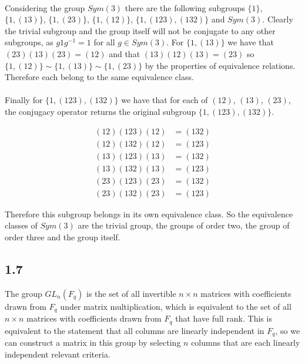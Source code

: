 \documentclass{article}
\begin{document}
\paragraph{}
Considering the group $Sym(3)$ there are the following subgroups $\{1\}$, $\{1,(13)\}$, $\{1,(23)\}$, $\{1, (12)\}$,
$\{1, (123), (132)\}$ and $Sym(3)$. Clearly the trivial subgroup and the group itself will not be conjugate to any other subgroups, as 
$g1g^{-1} = 1$ for all $g \in Sym(3)$. For $\{1,(13)\}$ we have that $(23)(13)(23) = (12)$ and that 
$(13)(12)(13) = (23)$ so $\{1, (12)\} \sim \{1,(13)\} \sim \{1, (23)\}$ by the properties of 
equivalence relations. Therefore each belong to the same equivalence class.

\paragraph{}
Finally for 
$\{1, (123), (132)\}$ we have that for each of $(12)$, $(13)$, $(23)$, the conjugacy operator 
returns the original subgroup $\{1, (123), (132)\}$. 

\begin{align*}
	(12)(123)(12) &= (132) \\
	(12)(132)(12) &= (123) \\
	(13)(123)(13) &= (132) \\
	(13)(132)(13) &= (123) \\
	(23)(123)(23) &= (132) \\
	(23)(132)(23) &= (123)
\end{align*}


Therefore this subgroup belongs in its own 
equivalence class. So the equivalence classes of $Sym(3)$ are the trivial group, the groups of 
order two, the group of order three and the group itself.

\subsection*{1.7}
The group $GL_n(F_q)$ is the set of all invertible $n \times n$ matrices with coefficients 
drawn from $F_q$ under matrix multiplication, which is equivalent to the set of all $n \times n$ 
matrices with coefficients drawn from $F_q$ that have full rank. This is equivalent to the 
statement that all columns are linearly independent in $F_q$, so we can construct a matrix in 
this group by selecting $n$ columns that are each linearly independent relevant criteria.
\end{document}
